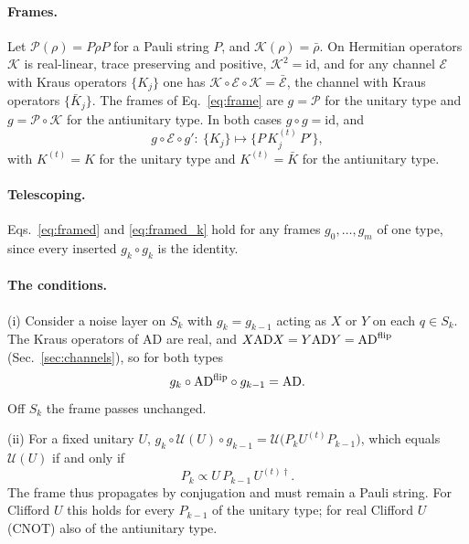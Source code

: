 \documentclass[
 aps,pra,
 twocolumn,
 superscriptaddress,
 longbibliography,
 nofootinbib
]{revtex4-2}
\newcommand{\AD}{\mathrm{AD}}
\begin{document}
\paragraph{Frames.}
Let $\mathcal P(\rho)=P\rho P$ for a Pauli string $P$, and $\mathcal K(\rho)=\bar\rho$. On Hermitian
operators $\mathcal K$ is real-linear, trace preserving and positive, $\mathcal K^2=\mathrm{id}$,
and for any channel $\mathcal E$ with Kraus operators $\{K_j\}$ one has
$\mathcal K\circ\mathcal E\circ\mathcal K=\bar{\mathcal E}$, the channel with Kraus operators
$\{\bar K_j\}$. The frames of Eq.~\eqref{eq:frame} are $g=\mathcal P$ for the unitary type and
$g=\mathcal P\circ\mathcal K$ for the antiunitary type. In both cases $g\circ g=\mathrm{id}$, and
\begin{equation}
g\circ\mathcal E\circ g'\colon\ \{K_j\}\mapsto\bigl\{P\,K_j^{(t)}\,P'\bigr\},
\label{eq:app_frame}
\end{equation}
with $K^{(t)}=K$ for the unitary type and $K^{(t)}=\bar K$ for the antiunitary type.

\paragraph{Telescoping.}
Eqs.~\eqref{eq:framed} and \eqref{eq:framed_k} hold for any frames
$g_0,\dots,g_m$ of one type, since every inserted $g_k\circ g_k$ is the identity.

\paragraph{The conditions.}
(i) Consider a noise layer on $S_k$ with $g_k=g_{k-1}$ acting as $X$ or $Y$ on each
$q\in S_k$. The Kraus operators of $\AD$ are real, and
$X\AD X=Y\AD Y=\AD^{\rm flip}$ (Sec.~\ref{sec:channels}), so for both types
\begin{equation}
g_k\circ\AD^{\rm flip}\circ g_{k-1}=\AD .
\label{eq:app_i}
\end{equation}
Off $S_k$ the frame passes unchanged.

(ii) For a fixed unitary $U$, $g_k\circ\mathcal U(U)\circ g_{k-1}=\mathcal U\bigl(P_kU^{(t)}P_{k-1}\bigr)$, which
equals $\mathcal U(U)$ if and only if
\begin{equation}
P_k\propto U\,P_{k-1}\,U^{(t)\dagger} .
\label{eq:app_ii}
\end{equation}
The frame thus propagates by conjugation and must remain a Pauli string. For Clifford $U$ this
holds for every $P_{k-1}$ of the unitary type; for real Clifford $U$ (CNOT) also of the
antiunitary type.
\end{document}
